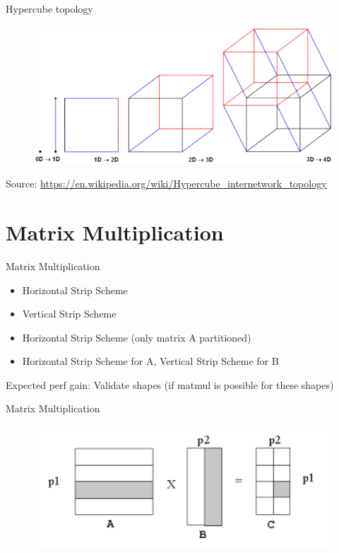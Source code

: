 \documentclass{beamer}
\begin{document}
\begin{frame}{Hypercube topology}
  \begin{figure}[h]
    \includegraphics[width=1\textwidth]{images/hypercube-topology.png}
  \end{figure}
  Source: \href{https://en.wikipedia.org/wiki/Hypercube_internetwork_topology}{https://en.wikipedia.org/wiki/Hypercube\_internetwork\_topology}
\end{frame}

\section{Matrix Multiplication}

\begin{frame}{Matrix Multiplication}
  \begin{itemize}
    \item Horizontal Strip Scheme
    \item Vertical Strip Scheme
    \item Horizontal Strip Scheme (only matrix A partitioned)
    \item Horizontal Strip Scheme for A, Vertical Strip Scheme for B
  \end{itemize}
  Expected perf gain:
  Validate shapes (if matmul is possible for these shapes)
\end{frame}

\begin{frame}{Matrix Multiplication}
  \begin{figure}[h]
    \includegraphics[width=1\textwidth]{images/matrix-multiplication.png}
  \end{figure}
\end{frame}
\end{document}
